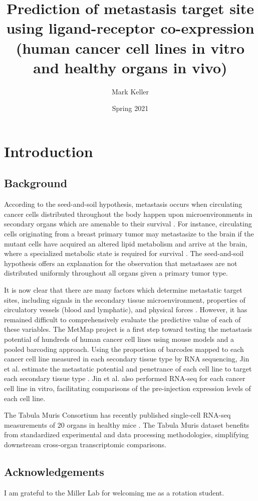\documentclass[12pt, letterpaper]{article}
\title{Prediction of metastasis target site using ligand-receptor co-expression (human cancer cell lines in vitro and healthy organs in vivo)}
\author{Mark Keller}
\date{Spring 2021}
\begin{document}
\maketitle

\section{Introduction}
\subsection{Background}
According to the seed-and-soil hypothesis, metastasis occurs when circulating cancer cells distributed throughout the body happen upon microenvironments in secondary organs which are amenable to their survival \cite{paget_distribution_1889}.
For instance, circulating cells originating from a breast primary tumor may metastasize to the brain if the mutant cells have acquired an altered lipid metabolism and arrive at the brain, where a specialized metabolic state is required for survival \cite{jin_metastasis_2020}.
The seed-and-soil hypothesis offers an explanation for the observation that metastases are not distributed uniformly throughout all organs given a primary tumor type.


It is now clear that there are many factors which determine metastatic target sites, including signals in the secondary tissue microenvironment, properties of circulatory vessels (blood and lymphatic), and physical forces \cite{gupta_cancer_2006}.
However, it has remained difficult to comprehensively evaluate the predictive value of each of these variables.
The MetMap project is a first step toward testing the metastasis potential of hundreds of human cancer cell lines using mouse models and a pooled barcoding approach.
Using the proportion of barcodes mapped to each cancer cell line measured in each secondary tissue type by RNA sequencing, Jin et al. estimate the metastatic potential and penetrance of each cell line to target each secondary tissue type \cite{jin_metastasis_2020}.
Jin et al. also performed RNA-seq for each cancer cell line in vitro, facilitating comparisons of the pre-injection expression levels of each cell line.


The Tabula Muris Consortium has recently published single-cell RNA-seq measurements of 20 organs in healthy mice \cite{schaum_single-cell_2018}.
The Tabula Muris dataset benefits from standardized experimental and data processing methodologies, simplifying downstream cross-organ transcriptomic comparisons.


\subsection*{Acknowledgements}
I am grateful to the Miller Lab for welcoming me as a rotation student.


{}

\end{document}
